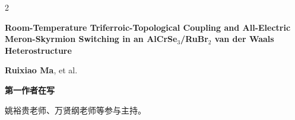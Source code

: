 \documentclass[10pt,a4paper,withhyper,ragged2e]{altacv}
\begin{document}
\begin{paracol}{2}
\divider

{\footnotesize
\textbf{Room-Temperature Triferroic-Topological Coupling and All-Electric Meron-Skyrmion Switching in an AlCrSe$_3$/RuBr$_2$ van der Waals Heterostructure}\par
\textbf{Ruixiao Ma}, et al.\par
\textcolor{accent}{\textbf{第一作者\enskip\textperiodcentered\enskip 在写}}\par
}



\divider


\divider


\divider


\divider



姚裕贵老师、万贤纲老师等参与主持。

\end{paracol}
\end{document}
